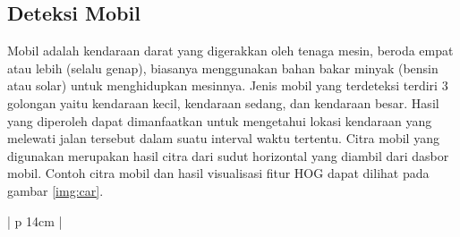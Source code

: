 \subsection{Deteksi Mobil}
Mobil adalah kendaraan darat yang digerakkan oleh tenaga mesin, beroda empat atau lebih (selalu genap), biasanya menggunakan bahan bakar minyak (bensin atau solar) untuk menghidupkan mesinnya. Jenis mobil yang terdeteksi terdiri 3 golongan yaitu kendaraan kecil, kendaraan sedang, dan kendaraan besar.  Hasil yang diperoleh dapat dimanfaatkan untuk mengetahui lokasi kendaraan yang melewati jalan tersebut dalam suatu interval waktu tertentu. Citra mobil yang digunakan merupakan hasil citra dari sudut horizontal yang diambil dari dasbor mobil. Contoh citra mobil dan hasil visualisasi fitur HOG dapat dilihat pada gambar \ref{img:car}.
\begin{table}[H]
	\small
	\begin{adjustbox}{width=1\textwidth}
		\begin{tabular}{| p {14cm} |}
			\hline
			\begin{figure}[H]
				\centering
			\end{figure} \\
			\hline
		\end{tabular}
	\end{adjustbox}
	\label{img:car}
\end{table}
\newpage